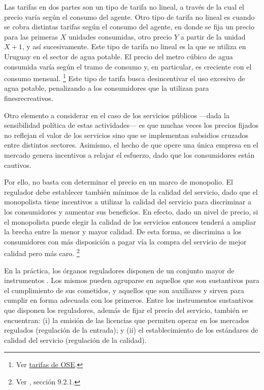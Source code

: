 \documentclass[
  12pt,
  spanish,
]{book}
\begin{document}
Las tarifas en dos partes son un tipo de tarifa no lineal, a través de la cual el precio varía según el consumo del agente. Otro tipo de tarifa no lineal es cuando se cobra distintas tarifas según el consumo del agente, en donde se fija un precio para las primeras \(X\) unidades consumidas, otro precio \(Y\) a partir de la unidad \(X+1\), y así sucesivamente. Este tipo de tarifa no lineal es la que se utiliza en Uruguay en el sector de agua potable. El precio del metro cúbico de agua consumida varía según el tramo de consumo y, en particular, es creciente con el consumo mensual.
\footnote{Ver \href{http://www.ose.com.uy/descargas/clientes/tarifas/ose_decreto_tarifario_2019.pdf}{tarifas de OSE}.}
Este tipo de tarifa busca desincentivar el uso excesivo de agua potable, penalizando a los consumidores que la utilizan para finesrecreativos.

Otro elemento a considerar en el caso de los servicios públicos ---dada la sensibilidad política de estas actividades--- es que muchas veces los precios fijados no reflejan el valor de los servicios sino que se implementan subsidios cruzados entre distintos sectores. Asimismo, el hecho de que opere una única empresa en el mercado genera incentivos a relajar el esfuerzo, dado que los consumidores están cautivos.

Por ello, no basta con determinar el precio en un marco de monopolio. El regulador debe establecer también mínimos de la calidad del servicio, dado que el monopolista tiene incentivos a utilizar la calidad del servicio para discriminar a los consumidores y aumentar sus beneficios. En efecto, dado un nivel de precio, si el monopolista puede elegir la calidad de los servicios entonces tenderá a ampliar la brecha entre la menor y mayor calidad. De esta forma, se discrimina a los consumidores con más disposición a pagar vía la compra del servicio de mejor calidad pero más caro.
\footnote{Ver \citet{Belleflamme2015}, sección 9.2.1.}

En la práctica, los órganos reguladores disponen de un conjunto mayor de instrumentos \citep{Berg2013}. Los mismos pueden agruparse en aquellos que son sustantivos para el cumplimiento de sus cometidos, y aquellos que son auxiliares y sirven para cumplir en forma adecuada con los primeros. Entre los instrumentos sustantivos que disponen los reguladores, además de fijar el precio del servicio, también se encuentran: (i) la emisión de las licencias que permiten operar en los mercados regulados (regulación de la entrada); y (ii) el establecimiento de los estándares de calidad del servicio (regulación de la calidad).
\end{document}
